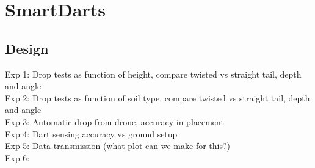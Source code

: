 \section{SmartDarts}\label{sec:SmartDarts}

\subsection{Design}
Exp 1: Drop tests as function of height, compare twisted vs straight tail, depth and angle\\
Exp 2: Drop tests as function of soil type, compare twisted vs straight tail, depth and angle\\
Exp 3: Automatic drop from drone, accuracy in placement\\
Exp 4: Dart sensing accuracy vs ground setup\\
Exp 5: Data transmission (what plot can we make for this?)\\
Exp 6: 